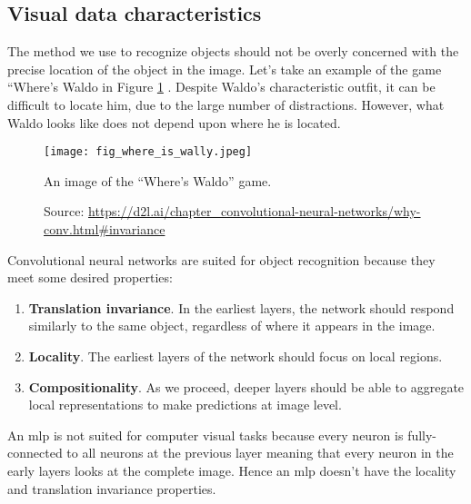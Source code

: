 \subsection{Visual data characteristics}
The method we use to recognize objects should not be overly concerned with the precise location of the object in the image. Let's take an example of the game “Where’s Waldo in Figure \ref{fig:where_is_wally} \cite{zhang2021dive}. Despite Waldo's characteristic outfit, it can be difficult to locate him, due to the large number of distractions. However, what Waldo looks like does not depend upon where he is located. 
\begin{figure}[ht]
    \begin{center}       
    \texttt{[image: fig\_where\_is\_wally.jpeg]}
    \caption[An image of the “Where’s Waldo” game]{An image of the “Where’s Waldo” game.}
    \caption*{Source: \href{https://d2l.ai/chapter\_convolutional-neural-networks/why-conv.html\#invariance}{https://d2l.ai/chapter\_convolutional-neural-networks/why-conv.html\#invariance}}
    \label{fig:where_is_wally}
    \end{center}
\end{figure}

Convolutional neural networks are suited for object recognition because they meet some desired properties:
\begin{enumerate}
    \item \textbf{Translation invariance}. In the earliest layers, the network should respond similarly to the same object, regardless of where it appears in the image. 
    \item \textbf{Locality}. The earliest layers of the network should focus on local regions.
    \item \textbf{Compositionality}. As we proceed, deeper layers should be able to aggregate local representations to make predictions at image level.
\end{enumerate}

An \acrshort{mlp} is not suited for computer visual tasks because every neuron is fully-connected to all neurons at the previous layer meaning that every neuron in the early layers looks at the complete image. Hence an \acrshort{mlp} doesn't have the locality and translation invariance properties.

